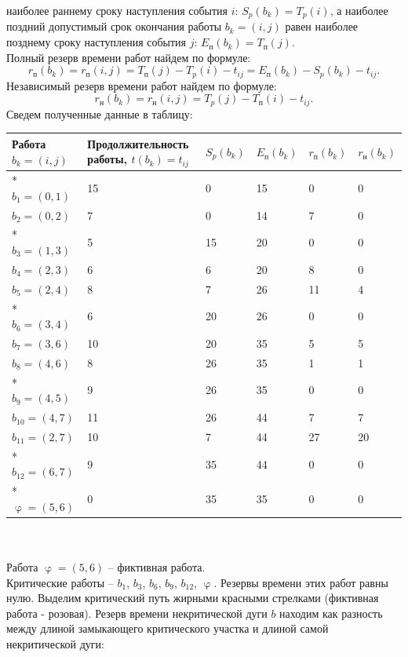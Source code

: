\documentclass[a4paper, 12pt]{report}
\renewcommand{\varphi}{\upvarphi}
\begin{document}
	наиболее раннему сроку наступления события $i$: $S_p(b_k) = T_p(i)$, а наиболее поздний допустимый срок окончания работы $b_k = (i, j)$ равен
	наиболее позднему сроку наступления события $j$: $E_\text{п}(b_k) = T_\text{п}(j)$.\\
	Полный резерв времени работ найдем по формуле:
	$$r_\text{п}(b_k)=r_\text{п}(i,j)=T_\text{п}(j)-T_p(i)-t_{ij}=E_\text{п}(b_k)-S_p(b_k)-t_{ij}.$$
	Независимый резерв времени работ найдем по формуле:
	$$r_\text{н}(b_k)=r_\text{н}(i,j)=T_p(j)-T_\text{п}(i)-t_{ij}.$$
	Сведем полученные данные в таблицу:\\
	\begin{tabular}{ |p{2.5cm}||p{5cm}||p{1cm}||p{1cm}||p{1cm}||p{1cm}|  }
		\hline
		Работа $b_k=(i,j)$& Продолжительность работы, $t(b_k)=t_{ij}$ & $S_p(b_k)$ & $E_\text{п}(b_k)$ & $r_\text{п}(b_k)$ & $r_\text{н}(b_k)$\\
		\hline
		* $b_1=(0,1)$ & 15 & 0 & 15 & 0 & 0\\
		\;\;\;$b_2=(0,2)$ & 7 & 0 & 14 & 7 & 0\\
		* $b_3=(1,3)$ & 5 & 15 & 20 & 0 & 0\\
		\;\;\;$b_4=(2,3)$ & 6 & 6 & 20 & 8 & 0\\
		\;\;\;$b_5=(2,4)$ & 8 & 7 & 26 & 11 & 4\\
		* $b_6=(3,4)$ & 6 & 20 & 26 & 0 & 0\\
		\;\;\;$b_7=(3,6)$ & 10 & 20 & 35 & 5 & 5\\
		\;\;\;$b_8=(4,6)$ & 8 & 26 & 35 & 1 & 1\\
		* $b_9=(4,5)$ & 9 & 26 & 35 & 0 & 0\\
		\;\;\;$b_{10}=(4,7)$ & 11 & 26 & 44 & 7 & 7\\
		\;\;\;$b_{11}=(2,7)$ & 10 & 7 & 44 & 27 & 20\\
		* $b_{12}=(6,7)$ & 9 & 35 & 44 & 0 & 0\\
		* $\varphi=(5,6)$ & 0 & 35 & 35 & 0 & 0\\
		\hline
	\end{tabular}\\\\
	Работа $\varphi = (5, 6)$ -- фиктивная работа.\\
	Критические работы -- $b_1$, $b_3$, $b_6$, $b_9$, $b_{12}$, $\varphi$. Резервы времени этих работ равны нулю. Выделим критический путь жирными красными стрелками (фиктивная работа - розовая).
	Резерв времени некритической дуги $b$ находим как разность между
	длиной замыкающего критического участка и длиной самой некритической дуги:
\end{document}
